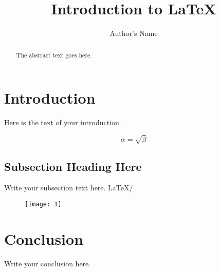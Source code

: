 \documentclass{article}
\begin{document}
	\title{Introduction to \LaTeX{}}
	\author{Author's Name}

	\maketitle

	\begin{abstract}
		The abstract text goes here.
	\end{abstract}

	\section{Introduction}
		Here is the text of your introduction.

	\begin{equation}
	    \label{simple_equation}
	    \alpha = \sqrt{ \beta }
	\end{equation}

	\subsection{Subsection Heading Here}
		Write your subsection text here.
		LaTeX/

	\begin{figure}
	\centering
	\texttt{[image: 1]}
	\end{figure}



	\section{Conclusion}
	Write your conclusion here.
\end{document}

